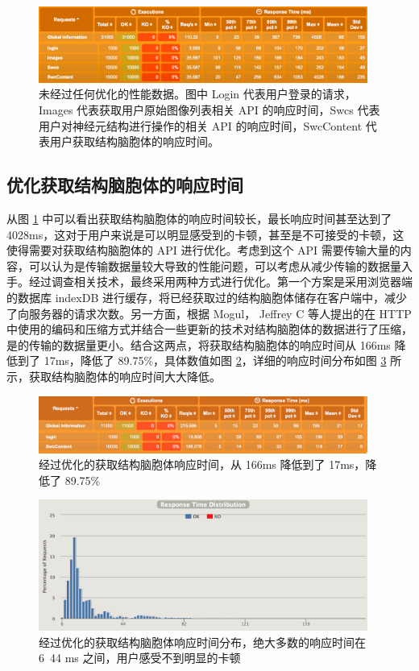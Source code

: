 \begin{figure}
\centering
\includegraphics[width=108mm]{images/origin}
\caption{未经过任何优化的性能数据。图中 Login 代表用户登录的请求， Images 代表获取用户原始图像列表相关 API 的响应时间，Swcs 代表用户对神经元结构进行操作的相关 API 的响应时间，SwcContent 代表用户获取结构脑胞体的响应时间。}
\label{origin}
\end{figure}

\subsection{优化获取结构脑胞体的响应时间}
从图 \ref{origin} 中可以看出获取结构脑胞体的响应时间较长，最长响应时间甚至达到了 4028ms，这对于用户来说是可以明显感受到的卡顿，甚至是不可接受的卡顿，这使得需要对获取结构脑胞体的 API 进行优化。考虑到这个 API 需要传输大量的内容，可以认为是传输数据量较大导致的性能问题，可以考虑从减少传输的数据量入手。经过调查相关技术，最终采用两种方式进行优化。第一个方案是采用浏览器端的数据库 indexDB 进行缓存，将已经获取过的结构脑胞体储存在客户端中，减少了向服务器的请求次数。另一方面，根据 Mogul， Jeffrey C 等人提出的在 HTTP 中使用的编码和压缩方式并结合一些更新的技术对结构脑胞体的数据进行了压缩，是的传输的数据量更小。结合这两点，将获取结构脑胞体的响应时间从 166ms 降低到了 17ms，降低了 89.75\%，具体数值如图 \ref{swccontent}，详细的响应时间分布如图 \ref{swcdic} 所示，获取结构脑胞体的响应时间大大降低。

\begin{figure}
\centering
\includegraphics[width=108mm]{images/swccontent}
\caption{经过优化的获取结构脑胞体响应时间，从 166ms 降低到了 17ms，降低了 89.75\%}
\label{swccontent}
\end{figure}

\begin{figure}
\centering
\includegraphics[width=108mm]{images/swcdic}
\caption{经过优化的获取结构脑胞体响应时间分布，绝大多数的响应时间在 6~44 ms 之间，用户感受不到明显的卡顿}
\label{swcdic}
\end{figure}

